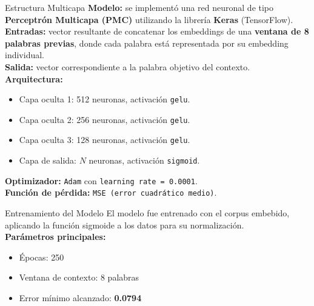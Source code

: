 \documentclass{beamer}
\begin{document}
	
\begin{frame}{Estructura Multicapa}
	\small
	\textbf{Modelo:} se implementó una red neuronal de tipo \textbf{Perceptrón Multicapa (PMC)} utilizando la librería \textbf{Keras} (TensorFlow).\\[0.4em]
	
	\textbf{Entradas:} vector resultante de concatenar los embeddings de una \textbf{ventana de 8 palabras previas}, donde cada palabra está representada por su embedding individual.\\[0.4em]

	\textbf{Salida:} vector correspondiente a la palabra objetivo del contexto.\\[0.4em]
	
	\textbf{Arquitectura:}
	\begin{itemize}
		\item Capa oculta 1: 512 neuronas, activación \texttt{gelu}.
		\item Capa oculta 2: 256 neuronas, activación \texttt{gelu}.
		\item Capa oculta 3: 128 neuronas, activación \texttt{gelu}.
		\item Capa de salida: $N$ neuronas, activación \texttt{sigmoid}.
	\end{itemize}
	
	\textbf{Optimizador:} \texttt{Adam} con \texttt{learning rate = 0.0001}.\\
	\textbf{Función de pérdida:} \texttt{MSE (error cuadrático medio)}.
\end{frame}

\begin{frame}{Entrenamiento del Modelo}
	\small
	El modelo fue entrenado con el corpus embebido, aplicando la función sigmoide a los datos para su normalización.\\[0.5em]
	
	\textbf{Parámetros principales:}
	\begin{itemize}
		\item Épocas: 250
		\item Ventana de contexto: 8 palabras
		\item Error mínimo alcanzado: \textbf{0.0794}
	\end{itemize}
	
	
\end{frame}
\end{document}
